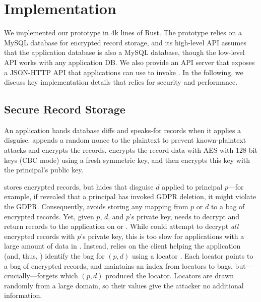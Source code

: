 \section{Implementation}
\label{s:impl}

%
We implemented our \sys prototype in 4k lines of Rust.
%
The prototype relies on a MySQL database for encrypted record storage, and
its high-level API assumes that the application database is also a MySQL
database, though the low-level API works with any application DB.
%
We also provide an API server that exposes a JSON-HTTP API that applications
can use to invoke \sys.
%
In the following, we discuss key implementation details that \sys relies for
security and performance.
%

\subsection{Secure Record Storage}
\label{s:impl-locators}
%
An application hands \sys database diffs and speaks-for records when it applies
a disguise.
%
\sys appends a random nonce to the plaintext to prevent known-plaintext attacks
and encrypts the records.
%
\sys encrypts the record data with AES with 128-bit keys (CBC mode) using a
fresh symmetric key, and then encrypts this key with the principal's public key.
%

%
\sys stores encrypted records, but hides that disguise $d$ applied to
principal $p$---for example, if \sys revealed that a principal has invoked
GDPR deletion, it might violate the GDPR.
%
Consequently, \sys avoids storing any mapping from $p$ or $d$ to a bag of
encrypted records.
%
Yet, given $p$, $d$, and $p$'s private key, \sys needs to decrypt and return
records to the application on  or .
%
While \sys could attempt to decrypt \emph{all} encrypted records with $p$'s
private key, this is too slow for applications with a large amount
of data in \sys.
%
Instead, \sys relies on the client helping the application (and, thus, \sys)
identify the bag for $(p, d)$ using a locator .
%
Each locator points to a bag of encrypted records, and \sys maintains an index
from locators to bags, but---crucially---forgets which $(p, d)$ produced the
locator.
%
Locators are drawn randomly from a large domain, so their values give
the attacker no additional information.
%

